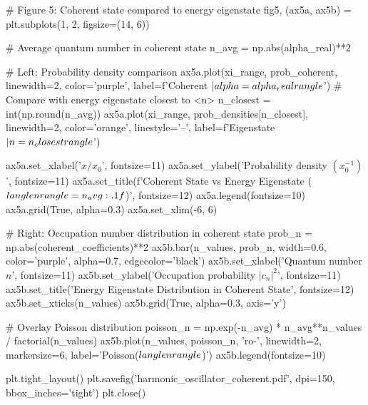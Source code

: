 \documentclass[a4paper, 11pt]{article}
\begin{document}
\begin{pycode}
# Figure 5: Coherent state compared to energy eigenstate
fig5, (ax5a, ax5b) = plt.subplots(1, 2, figsize=(14, 6))

# Average quantum number in coherent state
n_avg = np.abs(alpha_real)**2

# Left: Probability density comparison
ax5a.plot(xi_range, prob_coherent, linewidth=2, color='purple', label=f'Coherent $|\\alpha={alpha_real}\\rangle$')
# Compare with energy eigenstate closest to <n>
n_closest = int(np.round(n_avg))
ax5a.plot(xi_range, prob_densities[n_closest], linewidth=2, color='orange', linestyle='--',
         label=f'Eigenstate $|n={n_closest}\\rangle$')

ax5a.set_xlabel('$x/x_0$', fontsize=11)
ax5a.set_ylabel('Probability density $(x_0^{-1})$', fontsize=11)
ax5a.set_title(f'Coherent State vs Energy Eigenstate ($\\langle n \\rangle = {n_avg:.1f}$)', fontsize=12)
ax5a.legend(fontsize=10)
ax5a.grid(True, alpha=0.3)
ax5a.set_xlim(-6, 6)

# Right: Occupation number distribution in coherent state
prob_n = np.abs(coherent_coefficients)**2
ax5b.bar(n_values, prob_n, width=0.6, color='purple', alpha=0.7, edgecolor='black')
ax5b.set_xlabel('Quantum number $n$', fontsize=11)
ax5b.set_ylabel('Occupation probability $|c_n|^2$', fontsize=11)
ax5b.set_title('Energy Eigenstate Distribution in Coherent State', fontsize=12)
ax5b.set_xticks(n_values)
ax5b.grid(True, alpha=0.3, axis='y')

# Overlay Poisson distribution
poisson_n = np.exp(-n_avg) * n_avg**n_values / factorial(n_values)
ax5b.plot(n_values, poisson_n, 'ro-', linewidth=2, markersize=6, label='Poisson($\\langle n \\rangle$)')
ax5b.legend(fontsize=10)

plt.tight_layout()
plt.savefig('harmonic_oscillator_coherent.pdf', dpi=150, bbox_inches='tight')
plt.close()
\end{pycode}
\end{document}
